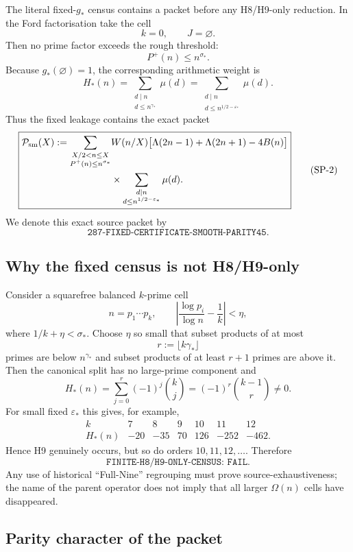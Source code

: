 \documentclass[11pt]{article}
\theoremstyle{definition}
\theoremstyle{remark}
\newcommand{\1}{\mathbf 1}
\begin{document}
The literal fixed-$g_*$ census contains a packet before any H8/H9-only reduction.  In the Ford factorisation
take the cell
\[
 k=0,\qquad J=\varnothing.
\]
Then no prime factor exceeds the rough threshold:
\[
 P^+(n)\le n^{\sigma_*}.
\]
Because $g_*(\varnothing)=1$, the corresponding arithmetic weight is
\[
 H_*(n)
 =
 \sum_{\substack{d\mid n\\ d\le n^{\gamma_*}}}\mu(d)
 =
 \sum_{\substack{d\mid n\\ d\le n^{1/2-\varepsilon_*}}}\mu(d).
 \tag{SP-1}
\]
Thus the fixed leakage contains the exact packet
\[
 \boxed{
 \begin{aligned}
 \mathcal P_{\rm sm}(X)
 :=
 \sum_{\substack{X/2<n\le X\\P^+(n)\le n^{\sigma_*}}}
 &W(n/X)
 \bigl[\Lambda(2n-1)+\Lambda(2n+1)-4B(n)\bigr]\\
 &\times
 \sum_{\substack{d\mid n\\d\le n^{1/2-\varepsilon_*}}}\mu(d).
 \end{aligned}}
 \tag{SP-2}
\]
We denote this exact source packet by
\[
 \boxed{\texttt{287-FIXED-CERTIFICATE-SMOOTH-PARITY45}.}
\]

\subsection{Why the fixed census is not H8/H9-only}

Consider a squarefree balanced $k$-prime cell
\[
 n=p_1\cdots p_k,
 \qquad
 \left|\frac{\log p_i}{\log n}-\frac1k\right|<\eta,
\]
where $1/k+\eta<\sigma_*$.  Choose $\eta$ so small that subset products of at most
\[
 r:=\lfloor k\gamma_*\rfloor
\]
primes are below $n^{\gamma_*}$ and subset products of at least $r+1$ primes are above it.  Then the canonical
split has no large-prime component and
\[
 H_*(n)
 =
 \sum_{j=0}^{r}(-1)^j\binom{k}{j}
 =
 \boxed{(-1)^r\binom{k-1}{r}\ne0.}
 \tag{SP-3}
\]
For small fixed $\varepsilon_*$ this gives, for example,
\[
\begin{array}{c|rrrrrr}
k&7&8&9&10&11&12\\
\hline
H_*(n)&-20&-35&70&126&-252&-462.
\end{array}
\]
Hence H9 genuinely occurs, but so do orders $10,11,12,\ldots$.  Therefore
\[
 \boxed{\texttt{FINITE-H8/H9-ONLY-CENSUS: FAIL}.}
 \tag{SP-4}
\]
Any use of historical ``Full-Nine'' regrouping must prove source-exhaustiveness; the name of the parent operator
does not imply that all larger $\Omega(n)$ cells have disappeared.

\subsection{Parity character of the packet}
\end{document}
